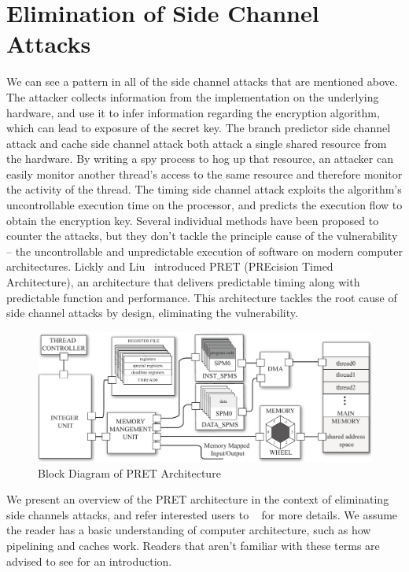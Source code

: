 \documentclass[times, 10pt,twocolumn]{article}
\begin{document}
\section{Elimination of Side Channel Attacks}
We can see a pattern in all of the side channel attacks that are mentioned above. The attacker collects information from the implementation on the underlying hardware, and use it to infer information regarding the encryption algorithm, which can lead to exposure of the secret key. The branch predictor side channel attack and cache side channel attack both attack a single shared resource from the hardware. By writing a spy process to hog up that resource, an attacker can easily monitor another thread's access to the same resource and therefore monitor the activity of the thread. The timing side channel attack exploits the algorithm's uncontrollable execution time on the processor, and predicts the execution flow to obtain the encryption key. Several individual methods have been proposed to counter the attacks, but they don't tackle the principle cause of the vulnerability -- the uncontrollable and unpredictable execution of software on modern computer architectures. Lickly and Liu~\cite{pret_cases08} introduced PRET (PREcision Timed Architecture), an architecture that delivers predictable timing along with predictable function and performance. This architecture tackles the root cause of side channel attacks by design, eliminating the vulnerability.

\begin{figure}[ht]
  \centering
  \includegraphics[scale=.25]{./images/top_arch.pdf}
  \caption{Block Diagram of PRET Architecture}
  \label{fig:top_arch}
\end{figure}

We present an overview of the PRET architecture in the context of eliminating side channels attacks, and refer interested users to ~\cite{pret_cases08} for more details. We assume the reader has a basic understanding of computer architecture, such as how pipelining and caches work. Readers that aren't familiar with these terms are advised to see \cite{patterson2005coa} for an introduction.
\end{document}
